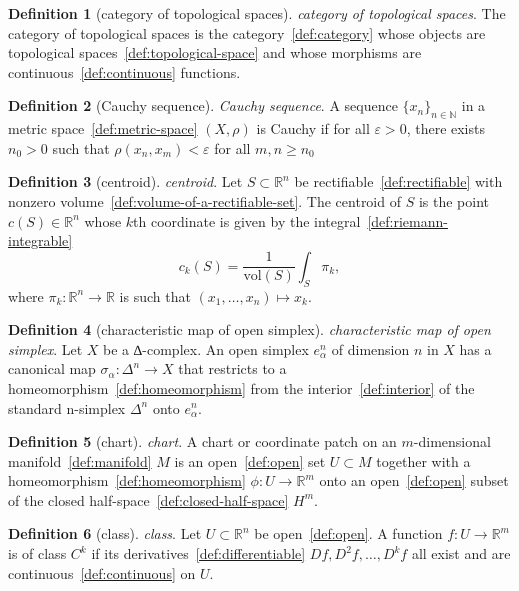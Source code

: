 \documentclass[12pt,a4paper]{article}
\theoremstyle{definition}
\newtheorem{definition}{Definition}
\begin{document}
\begin{definition}[category of topological spaces]\label{def:category-of-topological-spaces}
\emph{category of topological spaces}. The category of topological spaces is the category~\ref{def:category} whose objects are topological spaces~\ref{def:topological-space} and whose morphisms are continuous~\ref{def:continuous} functions.
\end{definition}

\begin{definition}[Cauchy sequence]\label{def:cauchy-sequence}
\emph{Cauchy sequence}. A sequence $\{x_n\}_{n\in\mathbb N}$ in a metric space~\ref{def:metric-space} $(X,\rho)$ is Cauchy if for all $\varepsilon > 0$, there exists $n_0 > 0$ such that $\rho(x_n, x_m) < \varepsilon$ for all $m,n \geq n_0$
\end{definition}

\begin{definition}[centroid]\label{def:centroid}
\emph{centroid}. Let $S \subset\mathbb R^n$ be rectifiable~\ref{def:rectifiable} with nonzero volume~\ref{def:volume-of-a-rectifiable-set}. The centroid of $S$ is the point $c(S) \in \mathbb R^n$ whose $k$th coordinate is given by the integral~\ref{def:riemann-integrable} $$c_k(S) = \frac{1}{\text{vol}(S)} \int_S \pi_k,$$ where $\pi_k:\mathbb R^n \to\mathbb R$ is such that $(x_1,\dots,x_n)\mapsto x_k$.
\end{definition}

\begin{definition}[characteristic map of open simplex]\label{def:characteristic-map-of-open-simplex}
\emph{characteristic map of open simplex}. Let $X$ be a ∆-complex. An open simplex $e_\alpha^n$ of dimension $n$ in $X$ has a canonical map $\sigma_\alpha: \Delta^n \to X$ that restricts to a homeomorphism~\ref{def:homeomorphism} from the interior~\ref{def:interior} of the standard n-simplex $\Delta^n$ onto $e_\alpha^n$.
\end{definition}

\begin{definition}[chart]\label{def:chart}
\emph{chart}. A chart or coordinate patch on an $m$-dimensional manifold~\ref{def:manifold} $M$ is an open~\ref{def:open} set $U\subset M$ together with a homeomorphism~\ref{def:homeomorphism} $\phi: U\to \mathbb R^m$ onto an open~\ref{def:open} subset of the closed half-space~\ref{def:closed-half-space} $H^m$.
\end{definition}

\begin{definition}[class]\label{def:class}
\emph{class}. Let $U \subset \mathbb R^n$ be open~\ref{def:open}. A function $f: U\to \mathbb R^m$ is of class $C^k$ if its derivatives~\ref{def:differentiable} $Df, D^2f,\dots, D^kf$ all exist and are continuous~\ref{def:continuous} on $U$.
\end{definition}
\end{document}
